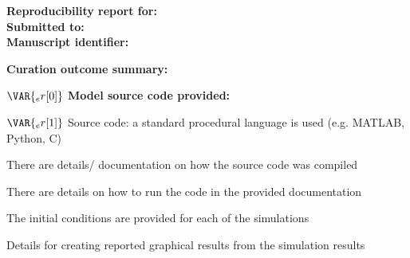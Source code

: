 \documentclass{article}
\date{}
\begin{document}
\noindent
\textbf{Reproducibility report for:} 
\\
\textbf{Submitted to:} 
\\
\textbf{Manuscript identifier:} 

\bigskip
\noindent
\textbf{Curation outcome summary:} 
\vspace{5mm}
\begin{tcolorbox}[breakable,height fill,
colback=white,
arc=0pt,
outer arc=0pt,
colframe=white,
top=2mm,
toptitle=2mm,
bottomtitle=2mm,
colbacktitle=white!80!black,
colframe=black,
coltitle=black, 
title= \textbf{Box 1:} Criteria for repeatability and reproducibility]
$\VAR{_er[0]}$ \textbf{Model source code provided:}
\begin{todolist}
  \item [$\VAR{_er[1]}$] Source code: a standard procedural language is used (e.g. MATLAB, Python, C)
  \begin{todolist}
      \item[\VAR{_er[2]}] There are details/ documentation on how the source code was compiled
      \item[\VAR{_er[3]}] There are details on how to run the code in the provided documentation
      \item[\VAR{_er[4]}] The initial conditions are provided for each of the simulations
      \item[\VAR{_er[5]}] Details for creating reported graphical results from the simulation results
  \end{todolist}
  

\end{todolist}
\end{tcolorbox}
\end{document}
